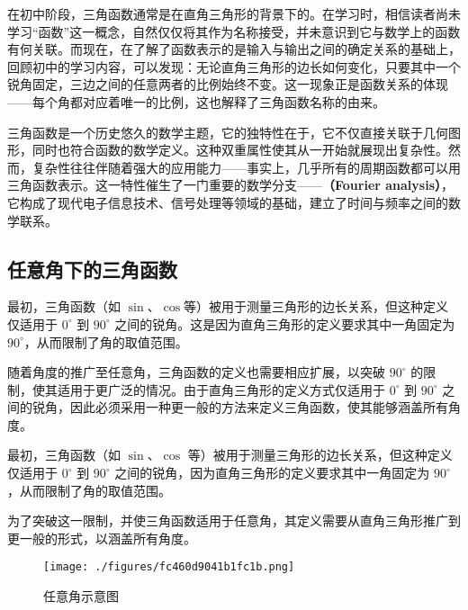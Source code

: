\begin{issues}
\issueDraft
\end{issues}

在初中阶段，三角函数通常是在直角三角形的背景下的。在学习时，相信读者尚未学习“函数”这一概念，自然仅仅将其作为名称接受，并未意识到它与数学上的函数有何关联。而现在，在了解了函数表示的是输入与输出之间的确定关系的基础上，回顾初中的学习内容，可以发现：无论直角三角形的边长如何变化，只要其中一个锐角固定，三边之间的任意两者的比例始终不变。这一现象正是函数关系的体现——每个角都对应着唯一的比例，这也解释了三角函数名称的由来。

三角函数是一个历史悠久的数学主题，它的独特性在于，它不仅直接关联于几何图形，同时也符合函数的数学定义。这种双重属性使其从一开始就展现出复杂性。然而，复杂性往往伴随着强大的应用能力——事实上，几乎所有的周期函数都可以用三角函数表示。这一特性催生了一门重要的数学分支——\textbf{（Fourier analysis）}，它构成了现代电子信息技术、信号处理等领域的基础，建立了时间与频率之间的数学联系。

\subsection{任意角下的三角函数}

最初，三角函数（如 $\sin$、$\cos$等）被用于测量三角形的边长关系，但这种定义仅适用于 $0^\circ$ 到 $90^\circ$ 之间的锐角。这是因为直角三角形的定义要求其中一角固定为 $90^\circ$，从而限制了角的取值范围。

随着角度的推广至任意角，三角函数的定义也需要相应扩展，以突破 $90^\circ$ 的限制，使其适用于更广泛的情况。由于直角三角形的定义方式仅适用于 $0^\circ$ 到 $90^\circ$ 之间的锐角，因此必须采用一种更一般的方法来定义三角函数，使其能够涵盖所有角度。

最初，三角函数（如 $\sin$、$\cos$ 等）被用于测量三角形的边长关系，但这种定义仅适用于 $0^\circ$ 到 $90^\circ$ 之间的锐角，因为直角三角形的定义要求其中一角固定为 $90^\circ$，从而限制了角的取值范围。

为了突破这一限制，并使三角函数适用于任意角，其定义需要从直角三角形推广到更一般的形式，以涵盖所有角度。


\begin{figure}[ht]
\centering
\texttt{[image: ./figures/fc460d9041b1fc1b.png]}
\caption{任意角示意图} \label{fig_HsTrFu_5}
\end{figure}

